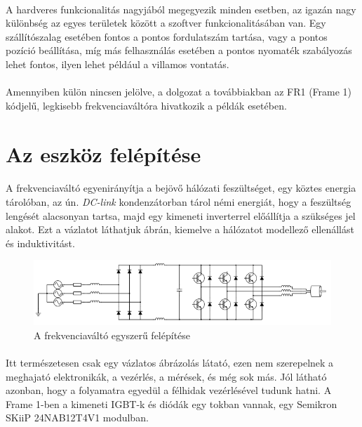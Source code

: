 \paragraph{}
A hardveres funkcionalitás nagyjából megegyezik minden esetben, az igazán nagy különbség az egyes területek között a szoftver funkcionalitásában van. Egy szállítószalag esetében fontos a pontos fordulatszám tartása, vagy a pontos pozíció beállítása, míg más felhasználás esetében a pontos nyomaték szabályozás lehet fontos, ilyen lehet például a villamos vontatás.

\paragraph{}
Amennyiben külön nincsen jelölve, a dolgozat a továbbiakban az FR1 (Frame 1) kódjelű, legkisebb frekvenciaváltóra hivatkozik a példák esetében.

\section{Az eszköz felépítése}

\paragraph{}
A frekvenciaváltó egyenirányítja a bejövő hálózati feszültséget, egy köztes energia tárolóban, az ún. \emph{DC-link} kondenzátorban tárol némi energiát, hogy a feszültség lengését alacsonyan tartsa, majd egy kimeneti inverterrel előállítja a szükséges jel alakot. Ezt a vázlatot láthatjuk  ábrán, kiemelve a hálózatot modellező ellenállást és induktivitást.

\begin{figure}[h]
	\centering
	\includegraphics[width = \textwidth]{figures/VFDschematic_choke.png}
	\caption{A frekvenciaváltó egyszerű felépítése} 
	\label{fig:vfd_schema}
\end{figure}

\paragraph{}
Itt természetesen csak egy vázlatos ábrázolás látató, ezen nem szerepelnek a meghajató elektronikák, a vezérlés, a mérések, és még sok más. Jól látható azonban, hogy a folyamatra egyedül a félhidak vezérlésével tudunk hatni. A Frame 1-ben a kimeneti IGBT-k és diódák egy tokban vannak, egy Semikron SKiiP 24NAB12T4V1 modulban. \cite{sutozoli}


